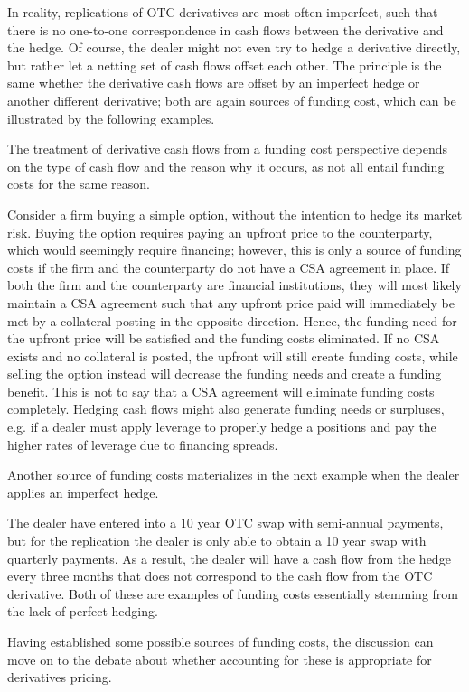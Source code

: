 \documentclass[main.tex]{subfiles}
\begin{document}
        In reality, replications of OTC derivatives are most often imperfect,
        such that there is no one-to-one correspondence in cash flows between the derivative and the hedge.
        Of course, the dealer might not even try to hedge a derivative directly,
        but rather let a netting set of cash flows offset each other. 
        The principle is the same whether the derivative cash flows are offset by an imperfect hedge
        or another different derivative;
        both are again sources of funding cost, which can be illustrated by the following examples.

        The treatment of derivative cash flows from a funding cost perspective 
        depends on the type of cash flow and the reason why it occurs,
        as not all entail funding costs for the same reason.

        \begin{example}
        Consider a firm buying a simple option, without the intention to hedge its market risk.
        Buying the option requires paying an upfront price to the counterparty,
        which would seemingly require financing;
        however, this is only a source of funding costs 
        if the firm and the counterparty do not have a CSA agreement in place.
        If both the firm and the counterparty are financial institutions, 
        they will most likely maintain a CSA agreement
        such that any upfront price paid will immediately be met by a collateral posting in the opposite direction.
        Hence, the funding need for the upfront price will be satisfied and the funding costs eliminated.
        If no CSA exists and no collateral is posted, the upfront will still create funding costs,
        while selling the option instead will decrease the funding needs and create a funding benefit.
        This is not to say that a CSA agreement will eliminate funding costs completely. 
        Hedging cash flows might also generate funding needs or surpluses, 
        e.g. if a dealer must apply leverage to properly hedge a positions 
        and pay the higher rates of leverage due to financing spreads.
        \end{example}

        Another source of funding costs materializes in the next example when the dealer applies an imperfect hedge.
        
        \begin{example}
        The dealer have entered into a 10 year OTC swap with semi-annual payments, 
        but for the replication the dealer is only able to obtain a 10 year swap with quarterly payments.
        As a result, the dealer will have a cash flow from the hedge every three months
        that does not correspond to the cash flow from the OTC derivative. 
        Both of these are examples of funding costs essentially stemming from the lack of perfect hedging.
        \end{example}

        Having established some possible sources of funding costs, 
        the discussion can move on to the debate about whether accounting for these is appropriate for derivatives pricing.
\end{document}
